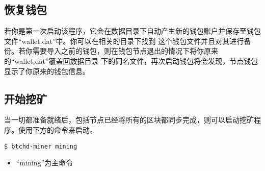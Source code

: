 \subsection{恢复钱包}
\begin{flushleft}
    若你是第一次启动该程序，它会在数据目录下自动产生新的钱包账户并保存至钱包文件``wallet.dat''中。你可以在相关的目录下找到
    这个钱包文件并且对其进行备份。若你需要导入之前的钱包，则在钱包节点退出的情况下将你原来的``wallet.dat''覆盖回数据目录
    下的同名文件，再次启动钱包将会发现，节点钱包显示了你原来的钱包信息。
\end{flushleft}
\subsection{开始挖矿}
\begin{flushleft}
    当一切都准备就绪后，包括节点已经将所有的区块都同步完成，则可以启动挖矿程序。使用下方的命令来启动。
\end{flushleft}
\scriptsize
\begin{verbatim}
$ btchd-miner mining
\end{verbatim}
\normalsize
\begin{itemize}
    \item ``mining''为主命令
\end{itemize}
